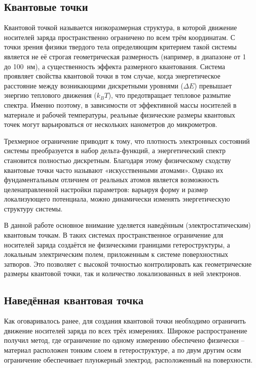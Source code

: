 \documentclass[a4paper,14pt]{extreport} %
\begin{document}
\subsection{Квантовые точки}

Квантовой точкой называется низкоразмерная структура, в которой движение носителей заряда пространственно ограничено по всем трём координатам. С точки зрения физики твердого тела определяющим критерием такой системы является не её строгая геометрическая размерность (например, в диапазоне от 1 до 100~нм), а существенность эффекта размерного квантования. Система проявляет свойства квантовой точки в том случае, когда энергетическое расстояние между возникающими дискретными уровнями ($\Delta E$) превышает энергию теплового движения ($k_B T$), что предотвращает тепловое размытие спектра. Именно поэтому, в зависимости от эффективной массы носителей в материале и рабочей температуры, реальные физические размеры квантовых точек могут варьироваться от нескольких нанометров до микрометров.

Трехмерное ограничение приводит к тому, что плотность электронных состояний системы преобразуется в набор дельта-функций, а энергетический спектр становится полностью дискретным. Благодаря этому физическому сходству квантовые точки часто называют «искусственными атомами». Однако их фундаментальным отличием от реальных атомов является возможность целенаправленной настройки параметров: варьируя форму и размер локализующего потенциала, можно динамически изменять энергетическую структуру системы.

В данной работе основное внимание уделяется наведённым (электростатическим) квантовым точкам. В таких системах пространственное ограничение для носителей заряда создаётся не физическими границами гетероструктуры, а локальным электрическим полем, приложенным к системе поверхностных затворов. Это позволяет с высокой точностью контролировать как геометрические размеры квантовой точки, так и количество локализованных в ней электронов.


\subsection{Наведённая квантовая точка}

Как оговаривалось ранее, для создания квантовой точки необходимо ограничить движение носителей заряда по всех трёх измерениях. Широкое распространение получил метод, где ограничение по одному измерению обеспечено физически – материал расположен тонким слоем в гетероструктуре, а по двум другим осям ограничение обеспечивает плунжерный электрод, расположенный на поверхности.
\end{document}
